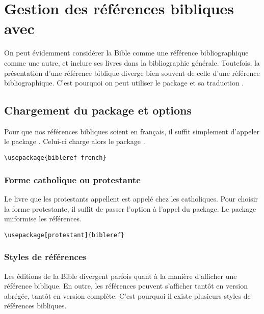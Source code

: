 \chapter{Gestion des références bibliques avec }

\begin{prealable}

On peut évidemment considérer la Bible comme une référence bibliographique comme une autre, et inclure ses livres dans la bibliographie générale.
Toutefois, la présentation d'une référence biblique diverge bien souvent de celle d'une référence bibliographique.
C'est pourquoi on peut utiliser le package  et sa traduction .
\end{prealable}


\section{Chargement du package et options}

Pour que nos références bibliques soient en français, il suffit simplement d'appeler le package . Celui-ci charge alors le package .


\begin{verbatim}
\usepackage{bibleref-french}
\end{verbatim}

\subsection{Forme catholique ou protestante}
Le livre que les protestants appellent  est appelé  chez les catholiques. Pour choisir la forme protestante, il suffit de passer l'option  à l'appel du package. Le package uniformise les références.

\begin{verbatim}
\usepackage[protestant]{bibleref}
\end{verbatim}

\subsection{Styles de références}

Les éditions de la Bible divergent parfois quant à la manière d'afficher une référence biblique. En outre, les références peuvent s'afficher tantôt en version abrégée, tantôt en version complète. C'est pourquoi il existe  plusieurs styles de références bibliques. 

